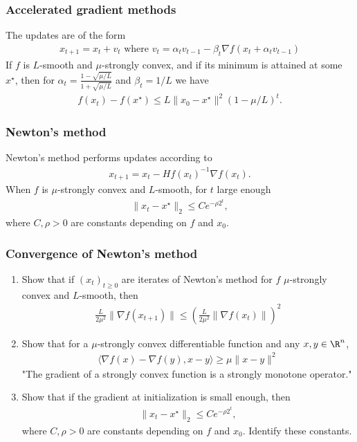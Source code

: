 \documentclass{beamer}
\begin{document}
\begin{frame}[t]
\frametitle{Accelerated gradient methods}
\vspace{-8pt}
\begin{theorem}
The updates are of the form
\begin{align}
x_{t+1} = x_t + v_t \text{ where } v_t = \alpha_t v_{t - 1} - \beta_t \nabla f(x_t + \alpha_t v_{t-1})
\end{align}
If $f$ is $L$-smooth and $\mu$-strongly convex, and if its minimum is attained at some $x^{\star}$, then for $\alpha_t = \frac{1-\sqrt{\mu/L}}{1+\sqrt{\mu/L}}$ and $\beta_t = 1/L$ we have
\begin{align}
f(x_t)-f(x^{\star}) \leq L\|x_0-x^{\star}\|^2 (1- \mu/L)^t .
\end{align}
\end{theorem}
\end{frame}

\begin{frame}[t]
\frametitle{Newton's method}
\vspace{-5pt}
\begin{theorem}
Newton’s method performs updates according to
\begin{align}
x_{t+1} =x_t -Hf(x_t)^{-1} \nabla f(x_t).
\end{align}
When $f$ is $\mu$-strongly convex and $L$-smooth, for $t$ large enough
\begin{align}
\|x_t - x^{\star}\|_2 \leq C e^{-\rho 2^t},
\end{align}
where $C, \rho > 0$ are constants depending on $f$ and $x_0$.
\end{theorem}
\end{frame}

\begin{frame}[t]
\frametitle{Convergence of Newton's method}
\vspace{-7pt}
\begin{enumerate}
\item Show that if ${(x_{t})}_{t \geq 0}$ are iterates of Newton's method for $f$ $\mu$-strongly convex and $L$-smooth, then  
\begin{align*}
\frac{L}{2 \mu^2} \|\nabla f(x_{t+1})\| \leq \left(\frac{L}{2 \mu^2} \|\nabla f(x_{t})\| \right)^2
\end{align*}
\item Show that for a $\mu$-strongly convex differentiable function and any $x, y \in \R^n$,
\begin{align*}
\langle \nabla f(x) - \nabla f(y), x - y \rangle \geq \mu \|x-y\|^2
\end{align*}
"The gradient of a strongly convex function is a strongly monotone operator."
\item Show that if the gradient at initialization is small enough, then 
\begin{align*}
\|x_t - x^{\star}\|_2 \leq C e^{-\rho 2^t},
\end{align*}
where $C, \rho > 0$ are constants depending on $f$ and $x_0$. Identify these constants.
\end{enumerate}
\end{frame}
\end{document}
